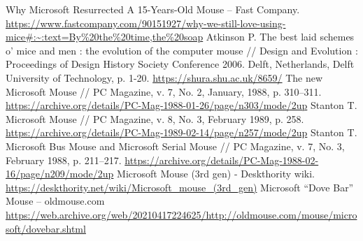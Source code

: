 \documentclass[11pt, a4paper]{article}
\begin{document}
\begin{thebibliography}{9}
 Why Microsoft Resurrected A 15-Years-Old Mouse -- Fast Company. \url{https://www.fastcompany.com/90151927/why-we-still-love-using-mice#:~:text=By%20the%20time,the%20soap}
 Atkinson P. The best laid schemes o’ mice and men : the evolution of the computer mouse // Design and Evolution : Proceedings of Design History Society Conference 2006. Delft, Netherlands, Delft University of Technology, p. 1-20. \url{https://shura.shu.ac.uk/8659/}
 The new Microsoft Mouse // PC Magazine, v. 7, No. 2, January, 1988, p. 310--311. \url{https://archive.org/details/PC-Mag-1988-01-26/page/n303/mode/2up}
 Stanton T. Microsoft Mouse // PC Magazine, v. 8, No. 3, February 1989, p. 258. \url{https://archive.org/details/PC-Mag-1989-02-14/page/n257/mode/2up}
 Stanton T. Microsoft Bus Mouse and Microsoft Serial Mouse // PC Magazine, v. 7, No. 3, February 1988, p. 211--217. \url{https://archive.org/details/PC-Mag-1988-02-16/page/n209/mode/2up}
 Microsoft Mouse (3rd gen) - Deskthority wiki. \url{https://deskthority.net/wiki/Microsoft_mouse_(3rd_gen)}
 Microsoft ``Dove Bar'' Mouse  -- oldmouse.com \url{https://web.archive.org/web/20210417224625/http://oldmouse.com/mouse/microsoft/dovebar.shtml}
\end{thebibliography}
\end{document}
